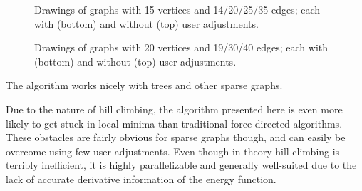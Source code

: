 \begin{figure}[H]
\centerline{
\hspace{4pt}%
\hspace{4pt}%
\hspace{4pt}%
%
}
\vspace{3pt}
\centerline{
\hspace{4pt}%
\hspace{4pt}%
\hspace{4pt}%
%
}
\caption{Drawings of graphs with 15 vertices and 14/20/25/35 edges; each with (bottom) and without (top) user adjustments.}
\label{fig:drawings-by-adjustments-15}
\end{figure}

\clearpage

\begin{figure}[H]
\centerline{
\hspace{4pt}%
\hspace{4pt}%
\hspace{4pt}%
}
\vspace{3pt}
\centerline{
\hspace{4pt}%
\hspace{4pt}%
%
}
\caption{Drawings of graphs with 20 vertices and 19/30/40 edges; each with (bottom) and without (top) user adjustments.}
\label{fig:drawings-by-adjustments-20}
\end{figure}





\vspace*{0.5cm}


The algorithm works nicely with trees and other sparse graphs.

Due to the nature of hill climbing, the algorithm presented here is even more likely to get stuck in local minima than traditional force-directed algorithms. These obstacles are fairly obvious for sparse graphs though, and can easily be overcome using few user adjustments. Even though in theory hill climbing is terribly inefficient, it is highly parallelizable and generally well-suited due to the lack of accurate derivative information of the energy function.

